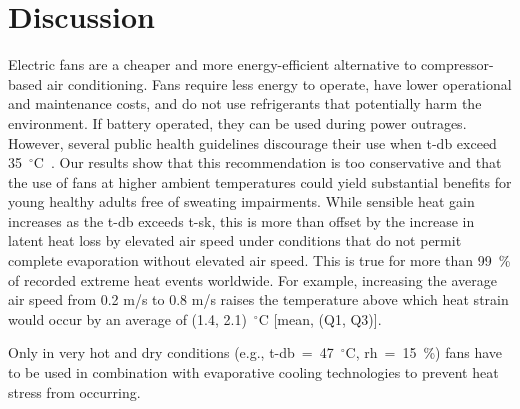 
\section{Discussion}\label{sec:discussion}


Electric fans are a cheaper and more energy-efficient alternative to compressor-based air conditioning.
Fans require less energy to operate, have lower operational and maintenance costs, and do not use refrigerants that potentially harm the environment. 
If battery operated, they can be used during power outrages. 
However, several public health guidelines discourage their use when \acf{t-db} exceed 35~$^{\circ}$C~\cite{WMO2015}.
Our results show that this recommendation is too conservative and that the use of fans at higher ambient temperatures could yield substantial benefits for young healthy adults free of sweating impairments.
While sensible heat gain increases as the \ac{t-db} exceeds \acf{t-sk}, this is more than offset by the increase in latent heat loss by elevated air speed under conditions that do not permit complete evaporation without elevated air speed. 
This is true for more than 99~\% of recorded extreme heat events worldwide.
For example, increasing the average air speed from 0.2 m/s to 0.8 m/s raises the temperature above which heat strain would occur by an average of  (1.4, 2.1)~$^{\circ}$C [mean, (Q1, Q3)]. 

Only in very hot and dry conditions (e.g., \ac{t-db}~=~47~$^{\circ}$C, \ac{rh}~=~15~\%) fans have to be used in combination with evaporative cooling technologies to prevent heat stress from occurring.


